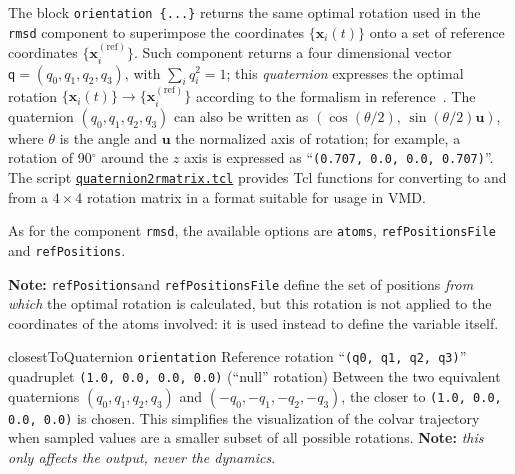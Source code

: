 The block \texttt{orientation~\{...\}} returns the
same optimal rotation used in the \texttt{rmsd} component to
superimpose the coordinates $\{\mathbf{x}_{i}(t)\}$ onto a set of
reference coordinates $\{\mathbf{x}_{i}^{\mathrm{(ref)}}\}$.  Such
component returns a four dimensional vector $\mathsf{q} = (q_0, q_1,
q_2, q_3)$, with $\sum_{i} q_{i}^{2} = 1$; this \emph{quaternion}
expresses the optimal rotation $\{\mathbf{x}_{i}(t)\} \rightarrow
\{\mathbf{x}_{i}^{\mathrm{(ref)}}\}$ according to the formalism in
reference~\cite{Coutsias2004}.  The quaternion $(q_0, q_1, q_2, q_3)$
can also be written as $\left(\cos(\theta/2), \,
  \sin(\theta/2)\mathbf{u}\right)$, where $\theta$ is the angle and
$\mathbf{u}$ the normalized axis of rotation; for example, a rotation
of 90$^{\circ}$ around the $z$ axis is expressed as
``\texttt{(0.707, 0.0, 0.0, 0.707)}''.  The script
\href{https://raw.githubusercontent.com/Colvars/colvars/master/colvartools/quaternion2rmatrix.tcl}{\texttt{quaternion2rmatrix.tcl}} provides Tcl functions for converting
to and from a $4\times{}4$ rotation matrix in a format suitable for
usage in VMD.

As for the component \texttt{rmsd}, the available options are \texttt{atoms}, \texttt{refPositionsFile} and \texttt{refPositions}.

\textbf{Note:} \texttt{refPositions}and \texttt{refPositionsFile} define the set of positions \emph{from which} the optimal rotation is calculated, but this rotation is not applied to the coordinates of the atoms involved: it is used instead to define the variable itself.

\begin{cvcoptions}
\item %
\item %
\item %


\item %
  \keydef
    {closestToQuaternion}{%
    \texttt{orientation}}{%
    Reference rotation}{%
    ``\texttt{(q0, q1, q2, q3)}'' quadruplet}{%
    \texttt{(1.0, 0.0, 0.0, 0.0)} (``null'' rotation)}{%
    Between the two equivalent quaternions $(q_0, q_1, q_2, q_3)$ and
    $(-q_0, -q_1, -q_2, -q_3)$, the closer to \texttt{(1.0, 0.0, 0.0,
      0.0)} is chosen.  This simplifies the visualization of the
    colvar trajectory when sampled values are a smaller subset of all
    possible rotations.  \textbf{Note:} \emph {this only affects the
      output, never the dynamics}.}

\end{cvcoptions}

